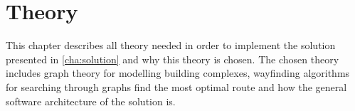 \chapter{Theory}

This chapter describes all theory needed in order to implement the solution presented in \cref{cha:solution} and why this theory is chosen. The chosen theory includes graph theory for modelling building complexes, wayfinding algorithms for searching through graphs find the most optimal route and how the general software architecture of the solution is.



%

%
%






